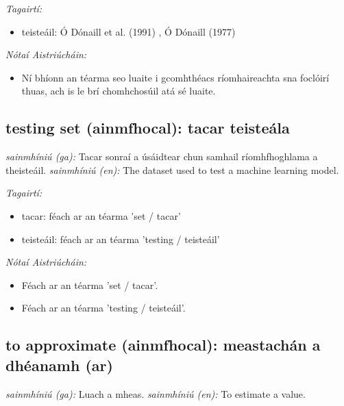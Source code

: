 \documentclass{article}
\begin{document}
 \noindent \textit{Tagairtí:}
\begin{itemize}
	\item teisteáil: Ó Dónaill et al. (1991) \cite{focloir-beag}, Ó Dónaill (1977) \cite{odonaill}
\end{itemize}

 \noindent \textit{Nótaí Aistriúcháin:}
\begin{itemize}
	\item Ní bhíonn an téarma seo luaite i gcomhthéacs ríomhaireachta sna foclóirí thuas, ach is le brí chomhchosúil atá sé luaite.
\end{itemize}


\subsection*{testing set (ainmfhocal): tacar teisteála} 
 \noindent \textit{sainmhíniú (ga):} Tacar sonraí a úsáidtear chun samhail ríomhfhoghlama a theisteáil.
\newline\newline
 \noindent \textit{sainmhíniú (en):} The dataset used to test a machine learning model.
\newline

 \noindent \textit{Tagairtí:}
\begin{itemize}
	\item tacar: féach ar an téarma 'set / tacar'
	\item teisteáil: féach ar an téarma 'testing / teisteáil'
\end{itemize}

 \noindent \textit{Nótaí Aistriúcháin:}
\begin{itemize}
	\item Féach ar an téarma 'set / tacar'.
	\item Féach ar an téarma 'testing / teisteáil'.
\end{itemize}


\subsection*{to approximate (ainmfhocal): meastachán a dhéanamh (ar)} 
 \noindent \textit{sainmhíniú (ga):} Luach a mheas.
\newline\newline
 \noindent \textit{sainmhíniú (en):} To estimate a value.
\newline
\end{document}
